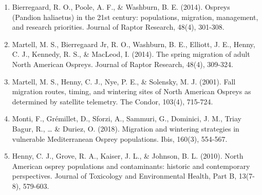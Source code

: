 \documentclass[
  letterpaper,
  DIV=11,
  numbers=noendperiod]{scrartcl}
\begin{document}
\begin{enumerate}
\def\labelenumi{\arabic{enumi}.}
\item
  Bierregaard, R. O., Poole, A. F., \& Washburn, B. E. (2014). Ospreys
  (Pandion haliaetus) in the 21st century: populations, migration,
  management, and research priorities. Journal of Raptor Research,
  48(4), 301-308.
\item
  Martell, M. S., Bierregaard Jr, R. O., Washburn, B. E., Elliott, J.
  E., Henny, C. J., Kennedy, R. S., \& MacLeod, I. (2014). The spring
  migration of adult North American Ospreys. Journal of Raptor Research,
  48(4), 309-324.
\item
  Martell, M. S., Henny, C. J., Nye, P. E., \& Solensky, M. J. (2001).
  Fall migration routes, timing, and wintering sites of North American
  Ospreys as determined by satellite telemetry. The Condor, 103(4),
  715-724.
\item
  Monti, F., Grémillet, D., Sforzi, A., Sammuri, G., Dominici, J. M.,
  Triay Bagur, R., \ldots{} \& Duriez, O. (2018). Migration and
  wintering strategies in vulnerable Mediterranean Osprey populations.
  Ibis, 160(3), 554-567.
\item
  Henny, C. J., Grove, R. A., Kaiser, J. L., \& Johnson, B. L. (2010).
  North American osprey populations and contaminants: historic and
  contemporary perspectives. Journal of Toxicology and Environmental
  Health, Part B, 13(7-8), 579-603.
\end{enumerate}
\end{document}
